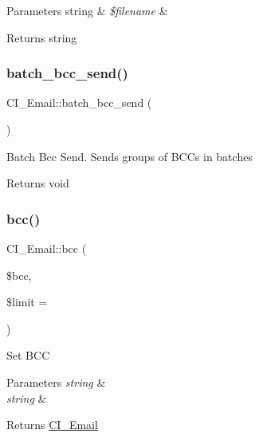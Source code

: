 \begin{DoxyParams}[1]{Parameters}
string & {\em \$filename} & \\
\hline
\end{DoxyParams}
\begin{DoxyReturn}{Returns}
string 
\end{DoxyReturn}
\mbox{\label{class_c_i___email_a8924024b733a015d3bb31f86436e5c87}} 
\subsubsection{\texorpdfstring{batch\+\_\+bcc\+\_\+send()}{batch\_bcc\_send()}}
{\footnotesize\ttfamily C\+I\+\_\+\+Email\+::batch\+\_\+bcc\+\_\+send (\begin{DoxyParamCaption}{ }\end{DoxyParamCaption})}

Batch Bcc Send. Sends groups of B\+C\+Cs in batches

\begin{DoxyReturn}{Returns}
void 
\end{DoxyReturn}
\mbox{\label{class_c_i___email_a85f20aa59849b09a0d1b72df04552503}} 
\subsubsection{\texorpdfstring{bcc()}{bcc()}}
{\footnotesize\ttfamily C\+I\+\_\+\+Email\+::bcc (\begin{DoxyParamCaption}\item[{}]{\$bcc,  }\item[{}]{\$limit = {\ttfamily \textquotesingle{}\textquotesingle{}} }\end{DoxyParamCaption})}

Set B\+CC


\begin{DoxyParams}{Parameters}
{\em string} & \\
\hline
{\em string} & \\
\hline
\end{DoxyParams}
\begin{DoxyReturn}{Returns}
\mbox{\hyperlink{class_c_i___email}{C\+I\+\_\+\+Email}} 
\end{DoxyReturn}
\mbox{\label{class_c_i___email_aaf1691518b38796d59f44434707a36a6}} 
